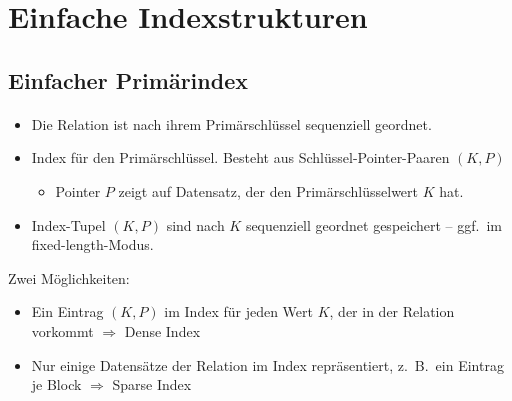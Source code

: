 \section{Einfache Indexstrukturen}

\subsection{Einfacher Prim\"arindex}

\begin{frame}{\insertsection}
	\framesubtitle{\insertsubsection}
	\begin{itemize}
		\item Die Relation ist nach ihrem Prim\"arschl\"ussel sequenziell geordnet.
	  \item Index f\"ur den Prim\"arschl\"ussel. Besteht aus Schlüssel-Pointer-Paaren $(K,P)$
	  \begin{itemize}
	  	\item Pointer $P$ zeigt auf Datensatz, der den Prim\"arschlüsselwert $K$ hat.
	  \end{itemize}
    \item Index-Tupel $(K,P)$ sind nach $K$ sequenziell geordnet gespeichert -- ggf.~im fixed-length-Modus.
  \end{itemize}
\pause
\abs
Zwei M\"oglichkeiten:
\begin{itemize}
	\item Ein Eintrag $(K,P)$ im Index für jeden Wert $K$, der in der Relation vorkommt $\Rightarrow$ Dense Index
	\item Nur einige Datens\"atze der Relation im Index repräsentiert, z.~B.~ein Eintrag je Block $\Rightarrow$ Sparse Index	
\end{itemize}
\end{frame}
  
